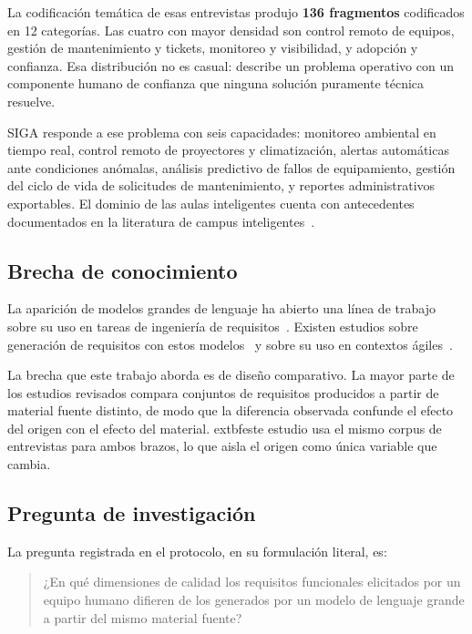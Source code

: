 \documentclass[11pt,a4paper]{article}
\begin{document}
La codificaci\'on tem\'atica de esas entrevistas produjo \textbf{136 fragmentos}
codificados en 12 categor\'ias. Las cuatro con mayor densidad son control remoto de equipos, gesti\'on
de mantenimiento y tickets, monitoreo y visibilidad, y adopci\'on y confianza. Esa
distribuci\'on no es casual: describe un problema operativo con un componente humano de
confianza que ninguna soluci\'on puramente t\'ecnica resuelve.

SIGA responde a ese problema con seis capacidades: monitoreo ambiental en tiempo real,
control remoto de proyectores y climatizaci\'on, alertas autom\'aticas ante condiciones
an\'omalas, an\'alisis predictivo de fallos de equipamiento, gesti\'on del ciclo de vida
de solicitudes de mantenimiento, y reportes administrativos exportables. El dominio de
las aulas inteligentes cuenta con antecedentes documentados en la literatura de campus
inteligentes~\cite{polin2023smartcampus,zhang2024smartclassrooms,kurni2025iot}.

\subsection{Brecha de conocimiento}

La aparici\'on de modelos grandes de lenguaje ha abierto una l\'inea de trabajo sobre su
uso en tareas de ingenier\'ia de requisitos~\cite{arora2024advancing,cheng2026genai,%
vogelsang2024using}. Existen estudios sobre generaci\'on de requisitos con estos
modelos~\cite{ronanki2023investigating,gorer2023generating,almeida2025elicitation} y
sobre su uso en contextos \'agiles~\cite{ray2023agile,ronanki2023chatgpt}.

La brecha que este trabajo aborda es de dise\~no comparativo. La mayor parte de los
estudios revisados compara conjuntos de requisitos producidos a partir de material
fuente distinto, de modo que la diferencia observada confunde el efecto del origen con
el efecto del material. 	extbf{este estudio usa el mismo corpus de entrevistas para ambos
brazos}, lo que aisla el origen como \'unica variable que cambia.

\subsection{Pregunta de investigaci\'on}

La pregunta registrada en el protocolo, en su formulaci\'on literal, es:

\begin{quote}
¿En qu\'e dimensiones de calidad los requisitos funcionales elicitados por un equipo
humano difieren de los generados por un modelo de lenguaje grande a partir del mismo
material fuente?
\end{quote}
\end{document}
